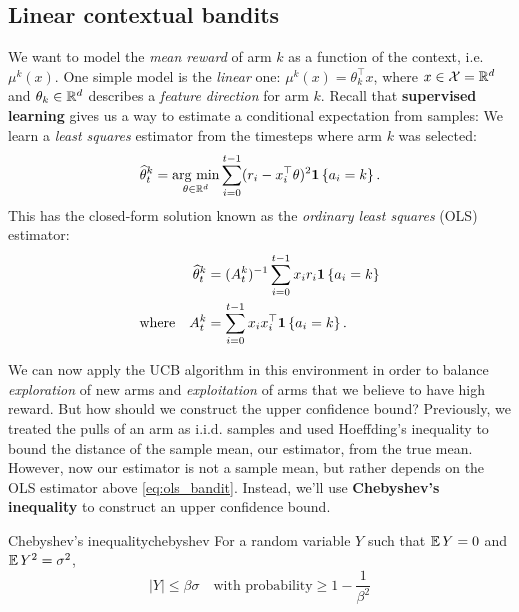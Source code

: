\documentclass[\main/main]{subfiles}
\begin{document}
\subsection{Linear contextual bandits}

We want to model the \emph{mean reward} of arm $k$ as a function of the context, i.e. $\mu^k(x)$.
One simple model is the \emph{linear} one: $\mu^k(x) = \theta_k^\top x$, where $x \in \mathcal{X} = \mathbb{R}^d$ and $\theta_k \in \mathbb{R}^d$ describes a \emph{feature direction} for arm $k$.
Recall that \textbf{supervised learning} gives us a way to estimate a conditional expectation from samples:
We learn a \emph{least squares} estimator from the timesteps where arm $k$ was selected:
\[
    \widehat \theta_t^k = \operatorname*{\textrm{arg\ min}}_{\theta \in \mathbb{R}^d} \sum_{i=0}^{t-1} (r_i - x_i^\top \theta)^2 \mathbf{1}\left\{a_i = k\right\}.
\]
This has the closed-form solution known as the \emph{ordinary least squares} (OLS) estimator:
\begin{equation}
    \begin{aligned}
        \widehat \theta_t^k &= (A_t^k)^{-1} \sum_{i=0}^{t-1} x_i r_i \mathbf{1}\left\{ a_i = k \right\} \\
        \text{where} \quad A_t^k &= \sum_{i=0}^{t-1} x_i x_i^\top \mathbf{1}\left\{a_i = k\right\}.
    \end{aligned}
    \label{eq:ols_bandit}
\end{equation}

We can now apply the UCB algorithm in this environment in order to balance \emph{exploration} of new arms and \emph{exploitation} of arms that we believe to have high reward.
But how should we construct the upper confidence bound?
Previously, we treated the pulls of an arm as i.i.d. samples and used Hoeffding's inequality to bound the distance of the sample mean, our estimator, from the true mean.
However, now our estimator is not a sample mean, but rather depends on the OLS estimator above \eqref{eq:ols_bandit}.
Instead, we'll use \textbf{Chebyshev's inequality} to construct an upper confidence bound.

\begin{theorem}{Chebyshev's inequality}{chebyshev}
    For a random variable $Y$ such that $\operatorname*{\mathbb{E}} Y = 0$ and $\operatorname*{\mathbb{E}} Y^2 = \sigma^2$,
    \[
        |Y| \le \beta \sigma \quad \text{with probability} \ge 1 - \frac{1}{\beta^2}
    \]
\end{theorem}
\end{document}
